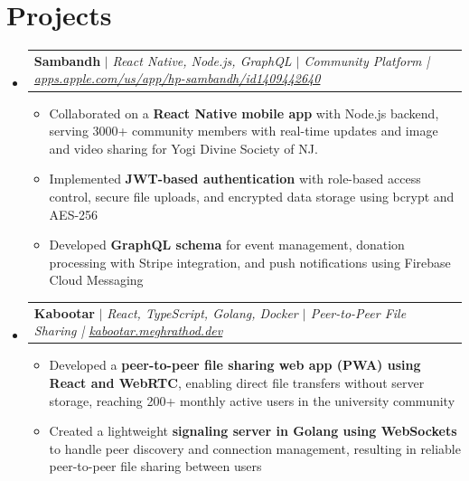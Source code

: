 \documentclass[letterpaper,11pt]{article}
\makeatletter
\newcommand{\resumeItem}[1]{
  \item\small{
    {#1 \vspace{-2pt}}
  }
}
\newcommand{\resumeProjectHeading}[2]{
    \item
    \begin{tabular*}{0.97\textwidth}{l@{\extracolsep{\fill}}r}
      \small#1 & #2 \\
    \end{tabular*}\vspace{-7pt}
}
\newcommand{\resumeSubHeadingListStart}{\begin{itemize}[leftmargin=0.15in, label={}]}
\newcommand{\resumeSubHeadingListEnd}{\end{itemize}}
\newcommand{\resumeItemListStart}{\begin{itemize}}
\newcommand{\resumeItemListEnd}{\end{itemize}\vspace{-5pt}}
\makeatother
\begin{document}
\section{Projects}
    \resumeSubHeadingListStart
      \resumeProjectHeading
          {\textbf{Sambandh} $|$ \emph{React Native, Node.js, GraphQL $|$ Community Platform | \href{https://apps.apple.com/us/app/hp-sambandh/id1409442640}{apps.apple.com/us/app/hp-sambandh/id1409442640}}}{}
          \resumeItemListStart
            \resumeItem{Collaborated on a \textbf{React Native mobile app} with Node.js backend, serving 3000+ community members with real-time updates and image and video sharing for Yogi Divine Society of NJ.}
            \resumeItem{Implemented \textbf{JWT-based authentication} with role-based access control, secure file uploads, and encrypted data storage using bcrypt and AES-256}
            \resumeItem{Developed \textbf{GraphQL schema} for event management, donation processing with Stripe integration, and push notifications using Firebase Cloud Messaging}
          \resumeItemListEnd

      \resumeProjectHeading
          {\textbf{Kabootar} $|$ \emph{React, TypeScript, Golang, Docker $|$ Peer-to-Peer File Sharing | \href{https://kabootar.meghrathod.dev/}{kabootar.meghrathod.dev}}}{}
          \resumeItemListStart
            \resumeItem{Developed a \textbf{peer-to-peer file sharing web app (PWA) using React and WebRTC}, enabling direct file transfers without server storage, reaching 200+ monthly active users in the university community}
            \resumeItem{ Created a lightweight \textbf{signaling server in Golang using WebSockets} to handle peer discovery and connection management, resulting in reliable peer-to-peer file sharing between users}
            
          \resumeItemListEnd
    \resumeSubHeadingListEnd


\end{document}
